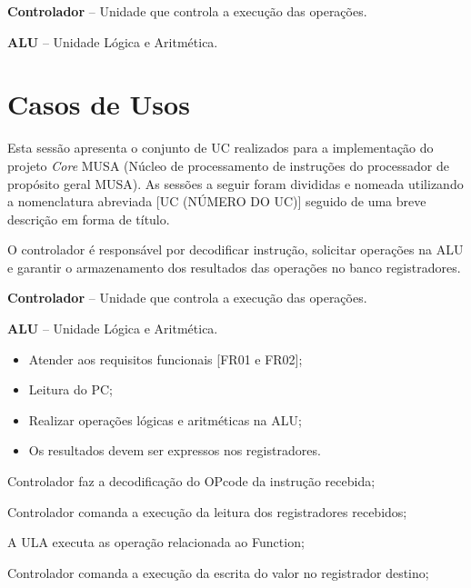 \documentclass{article}
\begin{document}
\textbf{Controlador} – Unidade que controla a execução das operações.

\textbf{ALU} – Unidade L\'{o}gica e Aritm\'{e}tica.
  
  \section{Casos de Usos}
  Esta sessão apresenta o conjunto de UC realizados para a implementação do projeto \textit{Core }MUSA (Núcleo de processamento de instruções do processador de propósito geral MUSA). As sessões a seguir foram divididas e nomeada utilizando a nomenclatura abreviada [UC (NÚMERO DO UC)] seguido de uma breve descrição em forma de título.

  O controlador é responsável por decodificar instrução, solicitar operações na ALU e garantir o armazenamento dos resultados das operações no banco registradores.
  
  \actors
    \begin{description}
     \item \textbf{Controlador} – Unidade que controla a execução das operações.
     \item \textbf{ALU} – Unidade L\'{o}gica e Aritm\'{e}tica.
    \end{description}
    
  \preconditions 
    \begin{itemize}
     \item Atender aos requisitos funcionais [FR01 e FR02];
     \item Leitura do PC;
     \item Realizar operações lógicas e aritméticas na ALU;
    \end{itemize}

  \postconditions
    \begin{itemize}
     \item Os resultados devem ser expressos nos registradores.
    \end{itemize}

  
  \begin{mainflow}
    \item Controlador faz a decodificação do OPcode da instrução recebida;
    \item Controlador comanda a execução da leitura dos registradores recebidos;
    \item A ULA executa as operação relacionada ao Function;
    \item Controlador comanda a execução da escrita do valor no registrador destino;
  \end{mainflow}
\end{document}
